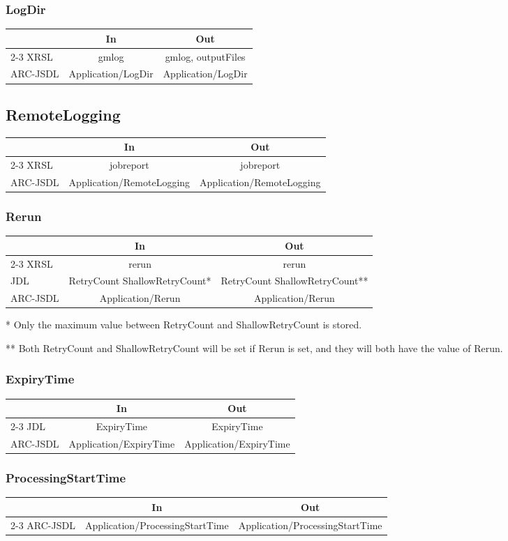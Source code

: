 \documentclass{article}
\newenvironment{inouttabular}%
{\begin{center}\begin{tabular}{l>{\ttfamily\footnotesize}c>{\ttfamily\footnotesize}c}%
\toprule
& \textnormal{\normalsize{In}} & \textnormal{\normalsize{Out}}\\ \cmidrule{2-3}}
{\bottomrule\end{tabular}\end{center}}
\begin{document}
\subsubsection{LogDir}
\begin{inouttabular}
XRSL & gmlog & gmlog, outputFiles\\
ARC-JSDL & Application/LogDir & Application/LogDir\\
\end{inouttabular}

\subsection{RemoteLogging}
\begin{inouttabular}
XRSL & jobreport & jobreport\\
ARC-JSDL & Application/RemoteLogging & Application/RemoteLogging\\
\end{inouttabular}

\subsubsection{Rerun}
\begin{inouttabular}
XRSL & rerun & rerun\\
JDL & RetryCount ShallowRetryCount* & RetryCount ShallowRetryCount**\\
ARC-JSDL & Application/Rerun & Application/Rerun\\
\end{inouttabular}
* Only the maximum value between RetryCount
and ShallowRetryCount is stored.

** Both RetryCount and ShallowRetryCount will be set if
Rerun is set, and they will both have the value of Rerun.

\subsubsection{ExpiryTime}
\begin{inouttabular}
JDL & ExpiryTime & ExpiryTime\\
ARC-JSDL & Application/ExpiryTime & Application/ExpiryTime\\
\end{inouttabular}

\subsubsection{ProcessingStartTime}
\begin{inouttabular}
ARC-JSDL & Application/ProcessingStartTime & Application/ProcessingStartTime\\
\end{inouttabular}
\end{document}
